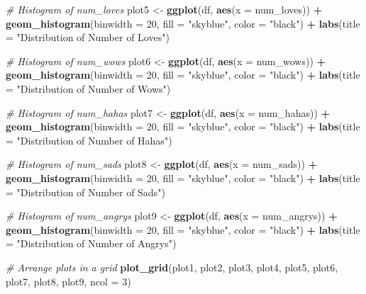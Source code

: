 \documentclass[
]{article}
\newenvironment{Shaded}{\begin{snugshade}}{\end{snugshade}}
\newcommand{\AttributeTok}[1]{\textcolor[rgb]{0.13,0.29,0.53}{#1}}
\newcommand{\CommentTok}[1]{\textcolor[rgb]{0.56,0.35,0.01}{\textit{#1}}}
\newcommand{\DecValTok}[1]{\textcolor[rgb]{0.00,0.00,0.81}{#1}}
\newcommand{\FunctionTok}[1]{\textcolor[rgb]{0.13,0.29,0.53}{\textbf{#1}}}
\newcommand{\NormalTok}[1]{#1}
\newcommand{\OtherTok}[1]{\textcolor[rgb]{0.56,0.35,0.01}{#1}}
\newcommand{\SpecialCharTok}[1]{\textcolor[rgb]{0.81,0.36,0.00}{\textbf{#1}}}
\newcommand{\StringTok}[1]{\textcolor[rgb]{0.31,0.60,0.02}{#1}}
\begin{document}
\begin{Shaded}
\begin{Highlighting}[]
\CommentTok{\# Histogram of num\_loves}
\NormalTok{plot5 }\OtherTok{\textless{}{-}} \FunctionTok{ggplot}\NormalTok{(df, }\FunctionTok{aes}\NormalTok{(}\AttributeTok{x =}\NormalTok{ num\_loves)) }\SpecialCharTok{+}
  \FunctionTok{geom\_histogram}\NormalTok{(}\AttributeTok{binwidth =} \DecValTok{20}\NormalTok{, }\AttributeTok{fill =} \StringTok{"skyblue"}\NormalTok{, }\AttributeTok{color =} \StringTok{"black"}\NormalTok{) }\SpecialCharTok{+}
  \FunctionTok{labs}\NormalTok{(}\AttributeTok{title =} \StringTok{"Distribution of Number of Loves"}\NormalTok{)}

\CommentTok{\# Histogram of num\_wows}
\NormalTok{plot6 }\OtherTok{\textless{}{-}} \FunctionTok{ggplot}\NormalTok{(df, }\FunctionTok{aes}\NormalTok{(}\AttributeTok{x =}\NormalTok{ num\_wows)) }\SpecialCharTok{+}
  \FunctionTok{geom\_histogram}\NormalTok{(}\AttributeTok{binwidth =} \DecValTok{20}\NormalTok{, }\AttributeTok{fill =} \StringTok{"skyblue"}\NormalTok{, }\AttributeTok{color =} \StringTok{"black"}\NormalTok{) }\SpecialCharTok{+}
  \FunctionTok{labs}\NormalTok{(}\AttributeTok{title =} \StringTok{"Distribution of Number of Wows"}\NormalTok{)}

\CommentTok{\# Histogram of num\_hahas}
\NormalTok{plot7 }\OtherTok{\textless{}{-}} \FunctionTok{ggplot}\NormalTok{(df, }\FunctionTok{aes}\NormalTok{(}\AttributeTok{x =}\NormalTok{ num\_hahas)) }\SpecialCharTok{+}
  \FunctionTok{geom\_histogram}\NormalTok{(}\AttributeTok{binwidth =} \DecValTok{20}\NormalTok{, }\AttributeTok{fill =} \StringTok{"skyblue"}\NormalTok{, }\AttributeTok{color =} \StringTok{"black"}\NormalTok{) }\SpecialCharTok{+}
  \FunctionTok{labs}\NormalTok{(}\AttributeTok{title =} \StringTok{"Distribution of Number of Hahas"}\NormalTok{)}

\CommentTok{\# Histogram of num\_sads}
\NormalTok{plot8 }\OtherTok{\textless{}{-}} \FunctionTok{ggplot}\NormalTok{(df, }\FunctionTok{aes}\NormalTok{(}\AttributeTok{x =}\NormalTok{ num\_sads)) }\SpecialCharTok{+}
  \FunctionTok{geom\_histogram}\NormalTok{(}\AttributeTok{binwidth =} \DecValTok{20}\NormalTok{, }\AttributeTok{fill =} \StringTok{"skyblue"}\NormalTok{, }\AttributeTok{color =} \StringTok{"black"}\NormalTok{) }\SpecialCharTok{+}
  \FunctionTok{labs}\NormalTok{(}\AttributeTok{title =} \StringTok{"Distribution of Number of Sads"}\NormalTok{)}

\CommentTok{\# Histogram of num\_angrys}
\NormalTok{plot9 }\OtherTok{\textless{}{-}} \FunctionTok{ggplot}\NormalTok{(df, }\FunctionTok{aes}\NormalTok{(}\AttributeTok{x =}\NormalTok{ num\_angrys)) }\SpecialCharTok{+}
  \FunctionTok{geom\_histogram}\NormalTok{(}\AttributeTok{binwidth =} \DecValTok{20}\NormalTok{, }\AttributeTok{fill =} \StringTok{"skyblue"}\NormalTok{, }\AttributeTok{color =} \StringTok{"black"}\NormalTok{) }\SpecialCharTok{+}
  \FunctionTok{labs}\NormalTok{(}\AttributeTok{title =} \StringTok{"Distribution of Number of Angrys"}\NormalTok{)}

\CommentTok{\# Arrange plots in a grid}
\FunctionTok{plot\_grid}\NormalTok{(plot1, plot2, plot3, plot4, plot5, plot6, plot7, plot8, plot9, }\AttributeTok{ncol =} \DecValTok{3}\NormalTok{)}
\end{Highlighting}
\end{Shaded}
\end{document}
